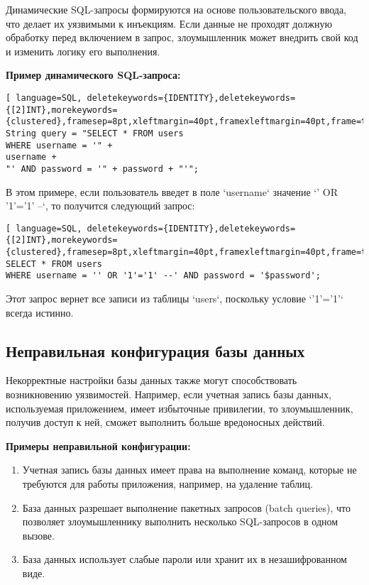 \documentclass[a4paper,12pt]{diplom}
\begin{document}
	Динамические SQL-запросы формируются на основе пользовательского ввода, что делает их уязвимыми к инъекциям.  Если данные не проходят должную обработку перед включением в запрос, злоумышленник может внедрить свой код и изменить логику его выполнения. 
	
	\textbf{Пример динамического SQL-запроса:}
	
	\begin{lstlisting}[ language=SQL, deletekeywords={IDENTITY},deletekeywords={[2]INT},morekeywords={clustered},framesep=8pt,xleftmargin=40pt,framexleftmargin=40pt,frame=tb,framerule=0pt]    
String query = "SELECT * FROM users
WHERE username = '" +
username + 
"' AND password = '" + password + "'";
	\end{lstlisting}
	
	В этом примере, если пользователь введет в поле `username` значение `' OR '1'='1' --`,  то получится следующий запрос: 
	
	\begin{lstlisting}[ language=SQL, deletekeywords={IDENTITY},deletekeywords={[2]INT},morekeywords={clustered},framesep=8pt,xleftmargin=40pt,framexleftmargin=40pt,frame=tb,framerule=0pt]    
SELECT * FROM users 
WHERE username = '' OR '1'='1' --' AND password = '$password';
	\end{lstlisting}
	
	Этот запрос вернет все записи из таблицы `users`,  поскольку условие `'1'='1'`  всегда истинно. 
	
	\subsection{Неправильная конфигурация базы данных}
	
	Некорректные настройки базы данных также могут способствовать возникновению уязвимостей.  Например,  если учетная запись базы данных, используемая приложением, имеет избыточные привилегии,  то злоумышленник,  получив доступ к ней,  сможет выполнить больше вредоносных действий. 
	
	\textbf{Примеры неправильной конфигурации:}
	
	\begin{enumerate}[label=\arabic{enumi})]
		\item Учетная запись базы данных имеет права на выполнение команд, которые не требуются для работы приложения, например, на удаление таблиц.
		\item База данных разрешает выполнение пакетных запросов (batch queries),  что позволяет злоумышленнику выполнить несколько SQL-запросов в одном вызове. 
		\item База данных использует слабые пароли или хранит их в незашифрованном виде.
	\end{enumerate}
	
\end{document}
